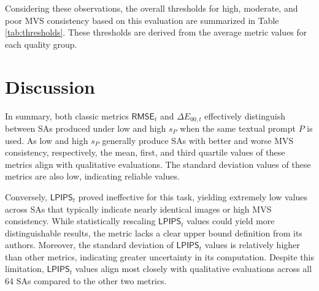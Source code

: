 Considering these observations, the overall thresholds for high, moderate, and poor MVS consistency based on this evaluation are summarized in Table \ref{tab:thresholds}. These thresholds are derived from the average metric values for each quality group.

\begin{table}[H]
	\centering
	\caption{Thresholds for high, moderate, and poor MVS consistency based on the average metric values for each quality group. For $\mathsf{RMSE}(\varGamma)$, moderate MVS consistency is a gray area where the metrics may not be sensitive enough to detect perceptual differences across views, potentially classifying results into either good or poor categories. No threshold is provided for $\Delta E_{00}(\varGamma)$ beyond excellent MVS consistency due to the high discrepancy between its calculated values and qualitative evaluation.}

	\label{tab:thresholds}
\end{table}

\section{Discussion}

In summary, both classic metrics $\mathsf{RMSE}_{t}$ and $\Delta E_{00,t}$ effectively distinguish between SAs produced under low and high $s_P$ when the same textual prompt $P$ is used. As low and high $s_P$ generally produce SAs with better and worse MVS consistency, respectively, the mean, first, and third quartile values of these metrics align with qualitative evaluations. The standard deviation values of these metrics are also low, indicating reliable values.

Conversely, $\mathsf{LPIPS}_{t}$ proved ineffective for this task, yielding extremely low values across SAs that typically indicate nearly identical images or high MVS consistency. While statistically rescaling $\mathsf{LPIPS}_{t}$ values could yield more distinguishable results, the metric lacks a clear upper bound definition from its authors. Moreover, the standard deviation of $\mathsf{LPIPS}_{t}$ values is relatively higher than other metrics, indicating greater uncertainty in its computation. Despite this limitation, $\mathsf{LPIPS}_{t}$ values align most closely with qualitative evaluations across all 64 SAs compared to the other two metrics.

